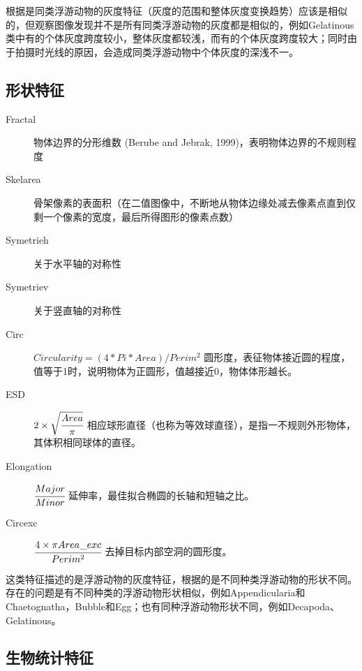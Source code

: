 
根据是同类浮游动物的灰度特征（灰度的范围和整体灰度变换趋势）应该是相似的，但观察图像发现并不是所有同类浮游动物的灰度都是相似的，例如Gelatinous类中有的个体灰度跨度较小，整体灰度都较浅，而有的个体灰度跨度较大；同时由于拍摄时光线的原因，会造成同类浮游动物中个体灰度的深浅不一。

\subsection{形状特征}

\begin{description}
    \item[Fractal] 物体边界的分形维数 (Berube and Jebrak, 1999)，表明物体边界的不规则程度
    \item[Skelarea] 骨架像素的表面积（在二值图像中，不断地从物体边缘处减去像素点直到仅剩一个像素的宽度，最后所得图形的像素点数）
    \item[Symetrieh] 关于水平轴的对称性
    \item[Symetriev] 关于竖直轴的对称性
    \item[Circ] $Circularity = (4 * Pi * Area) / Perim^2$ 圆形度，表征物体接近圆的程度，值等于1时，说明物体为正圆形，值越接近0，物体体形越长。
    \item[ESD] $2 \times \sqrt{\cfrac{Area}{\pi}}$ 相应球形直径（也称为等效球直径），是指一不规则外形物体，其体积相同球体的直径。
    \item[Elongation] $\cfrac{Major}{Minor}$ 延伸率，最佳拟合椭圆的长轴和短轴之比。
    \item[Circexc] $\cfrac{4 \times \pi Area\_exc}{Perim^{2}}$ 去掉目标内部空洞的圆形度。
\end{description}

这类特征描述的是浮游动物的灰度特征，根据的是不同种类浮游动物的形状不同。存在的问题是有不同种类的浮游动物形状相似，例如Appendicularia和Chaetognatha，Bubble和Egg；也有同种浮游动物形状不同，例如Decapoda、Gelatinous。

\subsection{生物统计特征}

